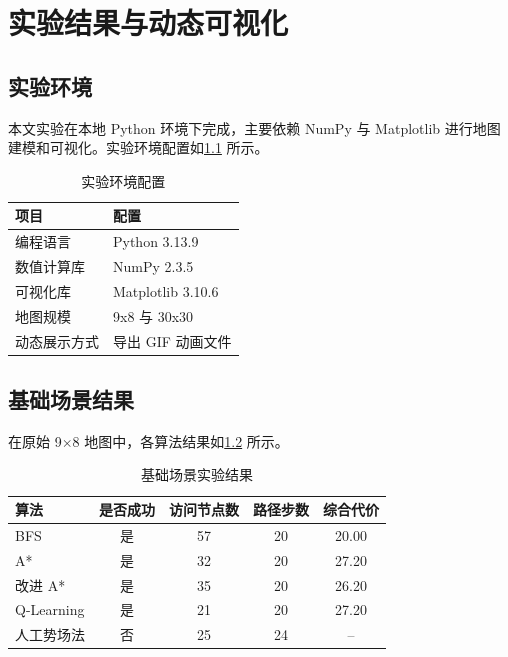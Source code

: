 \chapter{实验结果与动态可视化}\label{chap:experiment}

\section{实验环境}

本文实验在本地 Python 环境下完成，主要依赖 NumPy 与 Matplotlib 进行地图建模和可视化。实验环境配置如\cref{tab:env} 所示。

\begin{table}[!htb]
  \centering
  \caption{实验环境配置}\label{tab:env}
  \begin{tabular}{@{}ll@{}}
    \toprule
    \textbf{项目} & \textbf{配置} \\
    \midrule
    编程语言 & Python 3.13.9 \\
    数值计算库 & NumPy 2.3.5 \\
    可视化库 & Matplotlib 3.10.6 \\
    地图规模 & 9x8 与 30x30 \\
    动态展示方式 & 导出 GIF 动画文件 \\
    \bottomrule
  \end{tabular}
\end{table}

\section{基础场景结果}

在原始 9$\times$8 地图中，各算法结果如\cref{tab:basic-result} 所示。

\begin{table}[!htb]
  \centering
  \caption{基础场景实验结果}\label{tab:basic-result}
  \begin{tabular}{@{}lcccc@{}}
    \toprule
    \textbf{算法} & \textbf{是否成功} & \textbf{访问节点数} & \textbf{路径步数} & \textbf{综合代价} \\
    \midrule
    BFS & 是 & 57 & 20 & 20.00 \\
    A* & 是 & 32 & 20 & 27.20 \\
    改进 A* & 是 & 35 & 20 & 26.20 \\
    Q-Learning & 是 & 21 & 20 & 27.20 \\
    人工势场法 & 否 & 25 & 24 & -- \\
    \bottomrule
  \end{tabular}
\end{table}

